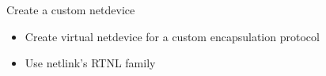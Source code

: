 \setuplabframe
{Create a custom netdevice}
{
  \begin{itemize}
  \item Create virtual netdevice for a custom encapsulation protocol
  \item Use netlink's RTNL family
  \end{itemize}
}
